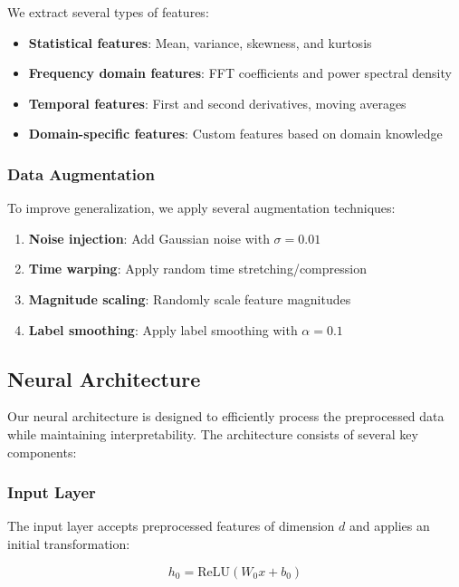 We extract several types of features:

\begin{itemize}
    \item \textbf{Statistical features}: Mean, variance, skewness, and kurtosis
    \item \textbf{Frequency domain features}: FFT coefficients and power spectral density
    \item \textbf{Temporal features}: First and second derivatives, moving averages
    \item \textbf{Domain-specific features}: Custom features based on domain knowledge
\end{itemize}

\subsubsection{Data Augmentation}

To improve generalization, we apply several augmentation techniques:

\begin{enumerate}
    \item \textbf{Noise injection}: Add Gaussian noise with $\sigma = 0.01$
    \item \textbf{Time warping}: Apply random time stretching/compression
    \item \textbf{Magnitude scaling}: Randomly scale feature magnitudes
    \item \textbf{Label smoothing}: Apply label smoothing with $\alpha = 0.1$
\end{enumerate}

\subsection{Neural Architecture}

Our neural architecture is designed to efficiently process the preprocessed data while maintaining interpretability. The architecture consists of several key components:

\subsubsection{Input Layer}

The input layer accepts preprocessed features of dimension $d$ and applies an initial transformation:

\begin{equation}
h_0 = \text{ReLU}(W_0 x + b_0)
\end{equation}

